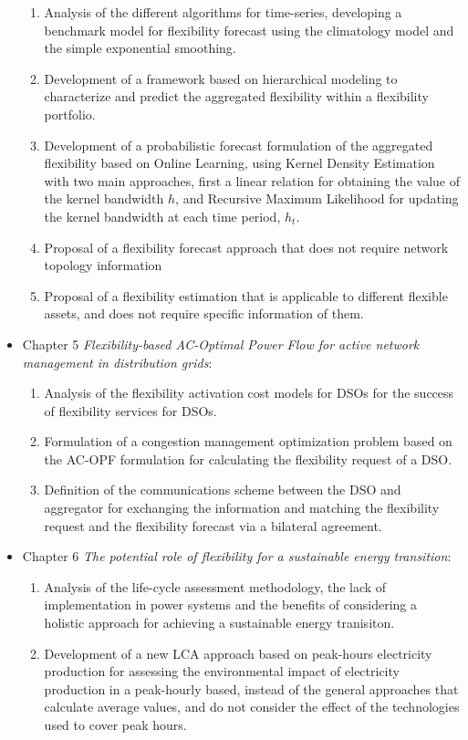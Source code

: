 \begin{itemize}
\begin{enumerate}
		\item Analysis of the different algorithms for time-series, developing a benchmark model for flexibility forecast using the climatology model and the simple exponential smoothing. 
		\item Development of a framework based on hierarchical modeling to characterize and predict the aggregated flexibility within a flexibility portfolio.
		\item Development  of a probabilistic forecast formulation of the aggregated flexibility based on Online Learning, using Kernel Density Estimation with two main approaches, first a linear relation for obtaining the value of the kernel bandwidth $h$, and Recursive Maximum Likelihood for updating the kernel bandwidth at each time period, $h_t$.
		\item Proposal of a flexibility forecast approach that does not require network topology information
		\item Proposal of a flexibility estimation that is applicable to different flexible assets, and does not require specific information of them. 
	\end{enumerate}
\item Chapter 5 \textit{Flexibility-based AC-Optimal Power Flow for active network management in distribution grids}: 
	\begin{enumerate}
		\item Analysis of the flexibility activation cost models for DSOs for the success of flexibility services for DSOs. 
		\item Formulation of a congestion management optimization problem based on the AC-OPF formulation for calculating the flexibility request of a DSO.
		\item Definition of the communications scheme between the DSO and aggregator for exchanging the information and matching the flexibility request and the flexibility forecast via a bilateral agreement.
	\end{enumerate}
\item Chapter 6 \textit{The potential role of flexibility for a sustainable energy transition}: 
	\begin{enumerate}
		\item Analysis of the life-cycle assessment methodology, the lack of implementation in power systems and the benefits of considering a holistic approach for achieving a sustainable energy tranisiton. 
		\item Development of a new LCA approach based on peak-hours electricity production for assessing the environmental impact of electricity production in a peak-hourly based, instead of the general approaches that calculate average values, and do not consider the effect of the technologies used to cover peak hours. 

\end{enumerate}
\end{itemize}
